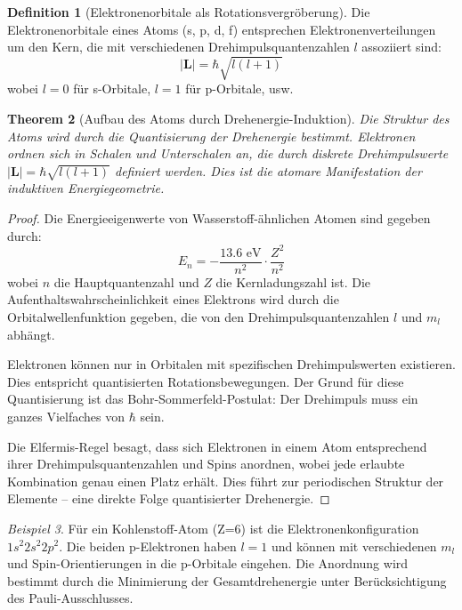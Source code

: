 \documentclass[12pt,a4paper]{report}
\theoremstyle{plain}
\newtheorem{theorem}{Theorem}[section]
\theoremstyle{definition}
\newtheorem{definition}[theorem]{Definition}
\theoremstyle{remark}
\newtheorem{beispiel}[theorem]{Beispiel}
\begin{document}
\begin{definition}[Elektronenorbitale als Rotationsvergröberung]
	Die Elektronenorbitale eines Atoms (s, p, d, f) entsprechen Elektronenverteilungen um den Kern, die mit verschiedenen Drehimpulsquantenzahlen $l$ assoziiert sind:
	\[
	|\mathbf{L}| = \hbar \sqrt{l(l+1)}
	\]
	wobei $l = 0$ für s-Orbitale, $l = 1$ für p-Orbitale, usw.
\end{definition}

\begin{theorem}[Aufbau des Atoms durch Drehenergie-Induktion]
	\label{thm:atombau}
	Die Struktur des Atoms wird durch die Quantisierung der Drehenergie bestimmt. Elektronen ordnen sich in Schalen und Unterschalen an, die durch diskrete Drehimpulswerte $|\mathbf{L}| = \hbar\sqrt{l(l+1)}$ definiert werden. Dies ist die atomare Manifestation der induktiven Energiegeometrie.
\end{theorem}

\begin{proof}
	Die Energieeigenwerte von Wasserstoff-ähnlichen Atomen sind gegeben durch:
	\[
	E_n = -\frac{13.6 \text{ eV}}{n^2} \cdot \frac{Z^2}{n^2}
	\]
	wobei $n$ die Hauptquantenzahl und $Z$ die Kernladungszahl ist. Die Aufenthaltswahrscheinlichkeit eines Elektrons wird durch die Orbitalwellenfunktion gegeben, die von den Drehimpulsquantenzahlen $l$ und $m_l$ abhängt.
	
	Elektronen können nur in Orbitalen mit spezifischen Drehimpulswerten existieren. Dies entspricht quantisierten Rotationsbewegungen. Der Grund für diese Quantisierung ist das Bohr-Sommerfeld-Postulat: Der Drehimpuls muss ein ganzes Vielfaches von $\hbar$ sein.
	
	Die Elfermis-Regel besagt, dass sich Elektronen in einem Atom entsprechend ihrer Drehimpulsquantenzahlen und Spins anordnen, wobei jede erlaubte Kombination genau einen Platz erhält. Dies führt zur periodischen Struktur der Elemente -- eine direkte Folge quantisierter Drehenergie.
\end{proof}

\begin{beispiel}
	Für ein Kohlenstoff-Atom (Z=6) ist die Elektronenkonfiguration $1s^2 2s^2 2p^2$. Die beiden p-Elektronen haben $l=1$ und können mit verschiedenen $m_l$ und Spin-Orientierungen in die p-Orbitale eingehen. Die Anordnung wird bestimmt durch die Minimierung der Gesamtdrehenergie unter Berücksichtigung des Pauli-Ausschlusses.
\end{beispiel}

\end{document}
